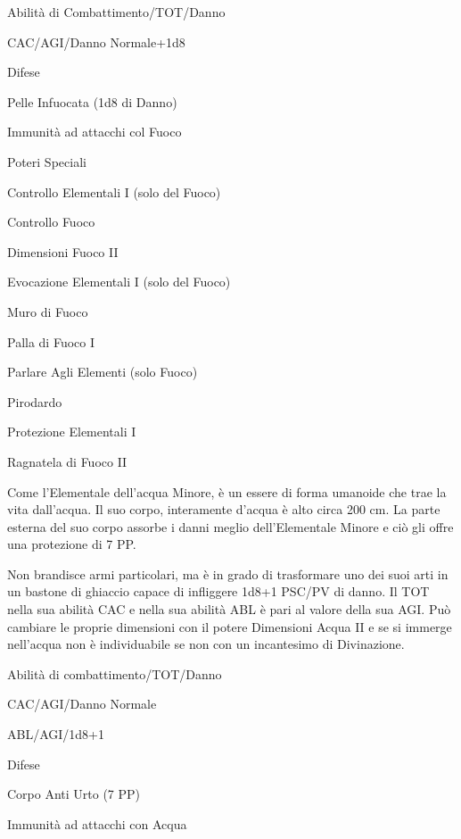 \begin{parmostro}{Abilit\`a di Combattimento/TOT/Danno} 
\item CAC/AGI/Danno Normale+1d8
\end{parmostro}

\begin{parmostro}{Difese}
\item Pelle Infuocata (1d8 di Danno) 
\item Immunit\`a ad attacchi col Fuoco
\end{parmostro}

\begin{parmostro}{Poteri Speciali} 
\item Controllo Elementali I (solo del Fuoco)
\item Controllo Fuoco
\item Dimensioni Fuoco II
\item Evocazione Elementali I (solo del Fuoco)
\item Muro di Fuoco
\item Palla di Fuoco I
\item Parlare Agli Elementi (solo Fuoco)
\item Pirodardo
\item Protezione Elementali I
\item Ragnatela di Fuoco II
\end{parmostro}


Come l'Elementale dell'acqua Minore, \`e un essere di forma umanoide
che trae la vita dall'acqua. Il suo corpo, interamente d'acqua \`e
alto circa 200 cm. La parte esterna del suo corpo assorbe i danni
meglio dell'Elementale Minore e ci\`o gli offre una protezione di 7
PP.

Non brandisce armi particolari, ma \`e in grado di trasformare uno
dei suoi arti in un bastone di ghiaccio capace di infliggere 1d8+1
PSC/PV di danno. Il TOT nella sua abilit\`a CAC e nella sua
abilit\`a ABL \`e pari al valore della sua AGI. Pu\`o cambiare
le proprie dimensioni con il potere Dimensioni Acqua II e se si
immerge nell'acqua non \`e individuabile se non con un incantesimo
di Divinazione.


\begin{parmostro}{Abilit\`a di combattimento/TOT/Danno}
\item CAC/AGI/Danno Normale 
\item ABL/AGI/1d8+1
\end{parmostro}
\begin{parmostro}{Difese} 
\item Corpo Anti Urto (7 PP) 
\item Immunit\`a ad attacchi con Acqua
\end{parmostro}


